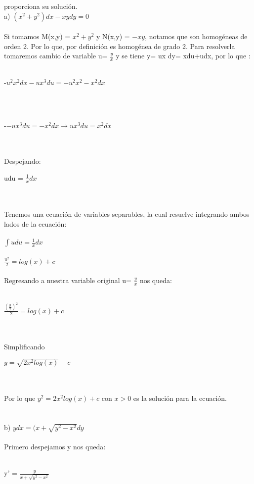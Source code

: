 \documentclass[a4paper,10pt]{article}
\begin{document}
proporciona su solución.\\
a) $(x^2 + y^2 ) dx - xydy = 0$\\\\
Si tomamos M(x,y) = $x^2 + y^2$ y N(x,y) = $ -xy$, notamos que son homogéneas de orden 2. 
Por lo que, por definición es homogénea de grado 2. Para resolverla tomaremos cambio de variable u= $\frac{y}{x}$ y se tiene y= ux dy= xdu+udx, por lo que :\\\\
\centerline{ -$u^2x^2dx - u x^3 du = -u^2x^2 -x^2dx$ }\\\\ 
\centerline{-$ - u x^3 du = -x^2dx \rightarrow ux^3 du =  x^2 dx$ }\\\\
Despejando:\\
\centerline{udu = $\frac{1}{x}dx$}\\\\
Tenemos una ecuación de variables separables, la cual resuelve integrando ambos lados de la ecuación:\\\\
$\int u du = \frac{1}{x} dx $\\\\
$ \frac{u^2}{2} = log(x) +c $\\\\
Regresando a nuestra variable original u= $\frac{y}{x}$ nos queda:\\\\
\centerline{$ \frac{(\frac{y}{x})^2}{2} = log(x) +c$}\\\\
Simplificando\\
\centerline{$ y = \sqrt{2x^2 log(x)} + c$}\\\\
Por lo que $ y^2 = 2x^2 log(x) + c$ con $x>0$ es la solución para la ecuación.\\\\\\
b) $ydx = (x + \sqrt{y^2 - x^2} dy$\\\\
Primero despejamos y nos queda:\\\\
\centerline{y' = $\frac{y }{x+ \sqrt{y^2 - x^2}}$} \\\\
\end{document}
